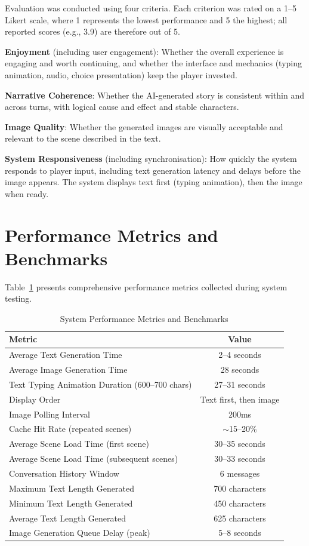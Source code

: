\documentclass[12pt,a4paper]{article}
\begin{document}
Evaluation was conducted using four criteria. Each criterion was rated on a 1--5 Likert scale, where 1 represents the lowest performance and 5 the highest; all reported scores (e.g., 3.9) are therefore out of 5.

\textbf{Enjoyment} (including user engagement): Whether the overall experience is engaging and worth continuing, and whether the interface and mechanics (typing animation, audio, choice presentation) keep the player invested.

\textbf{Narrative Coherence}: Whether the AI-generated story is consistent within and across turns, with logical cause and effect and stable characters.

\textbf{Image Quality}: Whether the generated images are visually acceptable and relevant to the scene described in the text.

\textbf{System Responsiveness} (including synchronisation): How quickly the system responds to player input, including text generation latency and delays before the image appears. The system displays text first (typing animation), then the image when ready.

\section{Performance Metrics and Benchmarks}

Table~\ref{tab:performance_metrics} presents comprehensive performance metrics collected during system testing.

\begin{table}[H]
\centering
\caption{System Performance Metrics and Benchmarks}
\label{tab:performance_metrics}
\begin{tabular}{lc}
\toprule
\textbf{Metric} & \textbf{Value} \\
\midrule
Average Text Generation Time & 2--4 seconds \\
Average Image Generation Time & 28 seconds \\
Text Typing Animation Duration (600--700 chars) & 27--31 seconds \\
Display Order & Text first, then image \\
Image Polling Interval & 200ms \\
Cache Hit Rate (repeated scenes) & $\sim$15--20\% \\
Average Scene Load Time (first scene) & 30--35 seconds \\
Average Scene Load Time (subsequent scenes) & 30--33 seconds \\
Conversation History Window & 6 messages \\
Maximum Text Length Generated & 700 characters \\
Minimum Text Length Generated & 450 characters \\
Average Text Length Generated & 625 characters \\
Image Generation Queue Delay (peak) & 5--8 seconds \\
\bottomrule
\end{tabular}
\end{table}
\end{document}
